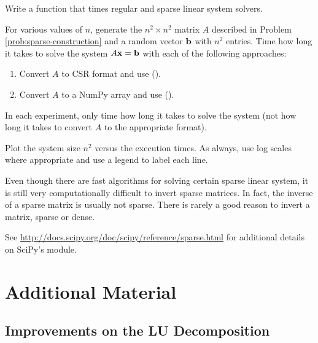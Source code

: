\begin{problem} %
Write a function that times regular and sparse linear system solvers.

For various values of $n$, generate the $n^{2} \times n^{2}$ matrix $A$ described in Problem \ref{prob:sparse-construction} and a random vector $\mathbf{b}$ with $n^2$ entries.
Time how long it takes to solve the system $A\mathbf{x} = \mathbf{b}$ with each of the following approaches:
%
\begin{enumerate}
\item Convert $A$ to CSR format and use  ().
\item Convert $A$ to a NumPy array and use  ().
\end{enumerate}
In each experiment, only time how long it takes to solve the system (not how long it takes to convert $A$ to the appropriate format).

Plot the system size $n^{2}$ versus the execution times.
As always, use log scales where appropriate and use a legend to label each line.
\end{problem}

\begin{warn} %
Even though there are fast algorithms for solving certain sparse linear system, it is still very computationally difficult to invert sparse matrices.
In fact, the inverse of a sparse matrix is usually not sparse.
There is rarely a good reason to invert a matrix, sparse or dense.
\end{warn}

See \url{http://docs.scipy.org/doc/scipy/reference/sparse.html} for additional details on SciPy's  module.

\newpage

\section*{Additional Material} %

\subsection*{Improvements on the LU Decomposition} %

